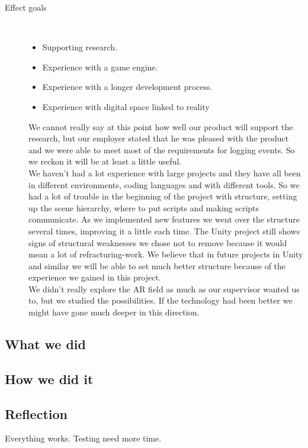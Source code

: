 \begin{description}
	\item[Effect goals]\ 
	\begin{itemize}
		\item Supporting research.
		\item Experience with a game engine.
		\item Experience with a longer development process.
		\item Experience with digital space linked to reality
	\end{itemize}
	We cannot really say at this point how well our product will support the research, but our employer stated that he was pleased with the product and we were able to meet most of the requirements for logging events. 
	So we reckon it will be at least a little useful.\\
	We haven't had a lot experience with large projects and they have all been in different environments, coding languages and with different tools. 
	So we had a lot of trouble in the beginning of the project with structure, setting up the scene hierarchy, where to put scripts and making scripts communicate. 
	As we implemented new features we went over the structure several times, improving it a little each time. 
	The Unity project still shows signs of structural weaknesses we chose not to remove because it would mean a lot of refracturing-work. 
	We believe that in future projects in Unity and similar we will be able to set much better structure because of the experience we gained in this project.\\
	We didn't really explore the AR field as much as our supervisor wanted us to, but we studied the possibilities. 
	If the technology had been better we might have gone much deeper in this direction.


\end{description}


\subsection{What we did}

\subsection{How we did it}

\subsection{Reflection}
Everything works.
Testing need more time.